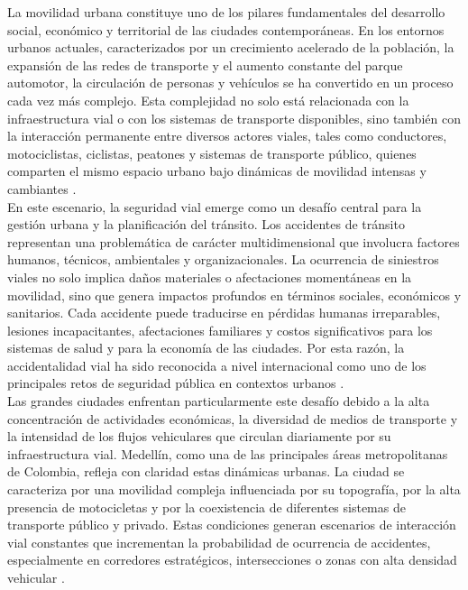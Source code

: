 La movilidad urbana constituye uno de los pilares fundamentales del desarrollo social, económico y territorial de las ciudades contemporáneas. En los entornos urbanos actuales, caracterizados por un crecimiento acelerado de la población, la expansión de las redes de transporte y el aumento constante del parque automotor, la circulación de personas y vehículos se ha convertido en un proceso cada vez más complejo. Esta complejidad no solo está relacionada con la infraestructura vial o con los sistemas de transporte disponibles, sino también con la interacción permanente entre diversos actores viales, tales como conductores, motociclistas, ciclistas, peatones y sistemas de transporte público, quienes comparten el mismo espacio urbano bajo dinámicas de movilidad intensas y cambiantes \cite{mina2024}.\\
En este escenario, la seguridad vial emerge como un desafío central para la gestión urbana y la planificación del tránsito. Los accidentes de tránsito representan una problemática de carácter multidimensional que involucra factores humanos, técnicos, ambientales y organizacionales. La ocurrencia de siniestros viales no solo implica daños materiales o afectaciones momentáneas en la movilidad, sino que genera impactos profundos en términos sociales, económicos y sanitarios. Cada accidente puede traducirse en pérdidas humanas irreparables, lesiones incapacitantes, afectaciones familiares y costos significativos para los sistemas de salud y para la economía de las ciudades. Por esta razón, la accidentalidad vial ha sido reconocida a nivel internacional como uno de los principales retos de seguridad pública en contextos urbanos \cite{valencia2025}.\\
Las grandes ciudades enfrentan particularmente este desafío debido a la alta concentración de actividades económicas, la diversidad de medios de transporte y la intensidad de los flujos vehiculares que circulan diariamente por su infraestructura vial. Medellín, como una de las principales áreas metropolitanas de Colombia, refleja con claridad estas dinámicas urbanas. La ciudad se caracteriza por una movilidad compleja influenciada por su topografía, por la alta presencia de motocicletas y por la coexistencia de diferentes sistemas de transporte público y privado. Estas condiciones generan escenarios de interacción vial constantes que incrementan la probabilidad de ocurrencia de accidentes, especialmente en corredores estratégicos, intersecciones o zonas con alta densidad vehicular \cite{ramirez2024}.\\
